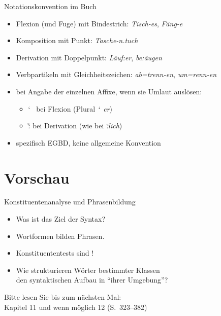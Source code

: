\begin{frame}
  {Notationskonvention im Buch}
  \pause
  \begin{itemize}[<+->]
    \item \alert{Flexion (und Fuge)} mit Bindestrich: \textit{Tisch-es}, \textit{Fäng-e}
    \item \alert{Komposition} mit Punkt: \textit{Tasche-n.tuch}
    \item \alert{Derivation} mit Doppelpunkt: \textit{Läuf:er}, \textit{be:äugen}
    \item \alert{Verbpartikeln} mit Gleichheitszeichen: \textit{ab=trenn-en}, \textit{um=renn-en}
    \Halbzeile
    \item bei Angabe der einzelnen Affixe, wenn sie Umlaut auslösen:
      \begin{itemize}[<+->]
        \item \char`~ bei Flexion (Plural \textit{\char`~er})
        \item \~: bei Derivation (wie bei \textit{\~:lich})
      \end{itemize}
    \Halbzeile
  \item spezifisch EGBD, keine allgemeine Konvention
  \end{itemize}
\end{frame}

\section{Vorschau}

\begin{frame}
  {Konstituentenanalyse und Phrasenbildung}
  \pause
  \begin{itemize}[<+->]
    \item Was ist das Ziel der Syntax?
    \item Wortformen bilden \alert{Phrasen}.
    \item Konstituententests sind !
    \item Wie strukturieren Wörter bestimmter Klassen\\
      den syntaktischen Aufbau in "`ihrer Umgebung"'?
  \end{itemize}
  \pause
  \Zeile
  \begin{center}
    Bitte lesen Sie bis zum nächsten Mal:\\
    \alert{Kapitel 11 und wenn möglich 12 (S.~323--382)}
  \end{center}
  \pause
  \pause
  \pause
  \pause
  \pause
\end{frame}



